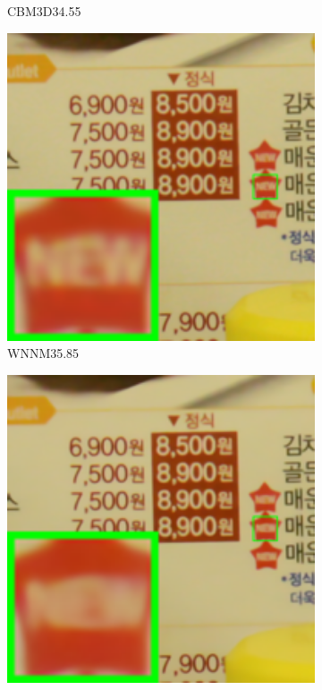 \begin{figure}
\begin{subfigure}[t]{0.19\textwidth}
		\caption{CBM3D34.55}
    \end{subfigure}
    \hfill
    \begin{subfigure}[t]{0.19\textwidth}
        \centering
        \includegraphics[width=1\textwidth]{images/guided/resize_br_WNNM_CC_Noisy_Nikon_D800_ISO_3200_A3_66.png}
		\caption{WNNM35.85}
    \end{subfigure}
    \hfill
    \begin{subfigure}[t]{0.19\textwidth}
        \centering
        \includegraphics[width=1\textwidth]{images/guided/resize_br_CSF_CC_Noisy_Nikon_D800_ISO_3200_A3_66.png}

\end{subfigure}
\end{figure}
